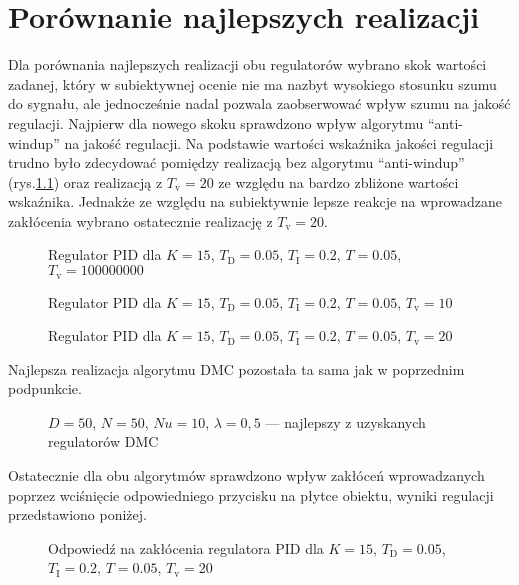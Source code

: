 \chapter{Porównanie najlepszych realizacji}
Dla porównania najlepszych realizacji obu regulatorów wybrano skok wartości zadanej, który w subiektywnej ocenie nie ma nazbyt wysokiego stosunku szumu do sygnału, ale jednocześnie nadal pozwala zaobserwować wpływ szumu na jakość regulacji. Najpierw dla nowego skoku sprawdzono wpływ algorytmu ``anti-windup'' na jakość regulacji. Na podstawie wartości wskaźnika jakości regulacji trudno było zdecydować pomiędzy realizacją bez algorytmu ``anti-windup'' (rys.\ref{PID1}) oraz realizacją z $T_\mathrm{v}=20$ ze względu na bardzo zbliżone wartości wskaźnika. Jednakże ze względu na subiektywnie lepsze reakcje na wprowadzane zakłócenia wybrano ostatecznie realizację z $T_\mathrm{v}=20$.

\begin{figure}[H]
\centering

\label{PID1}
\caption{Regulator PID dla $K = 15$, $T_\mathrm{D} = 0.05$, $T_\mathrm{I} = 0.2$, $T = 0.05$, $T_\mathrm{v} = 100000000$}
\end{figure}

\begin{figure}[H]
\centering

\label{PID2}
\caption{Regulator PID dla $K = 15$, $T_\mathrm{D} = 0.05$, $T_\mathrm{I} = 0.2$, $T = 0.05$, $T_\mathrm{v} = 10$}
\end{figure}

\begin{figure}[H]
\centering

\label{PID3}
\caption{Regulator PID dla $K = 15$, $T_\mathrm{D} = 0.05$, $T_\mathrm{I} = 0.2$, $T = 0.05$, $T_\mathrm{v} = 20$}
\end{figure}

Najlepsza realizacja algorytmu DMC pozostała ta sama jak w poprzednim podpunkcie.

\begin{figure}[H]
\centering

\caption{$ D = 50 $, $  N = 50 $, $ Nu = 10 $, $ \lambda = 0,5 $ --- najlepszy z uzyskanych regulatorów DMC}
\label{DMC6}
\end{figure}

Ostatecznie dla obu algorytmów sprawdzono wpływ zakłóceń wprowadzanych poprzez wciśnięcie odpowiedniego przycisku na płytce obiektu, wyniki regulacji przedstawiono poniżej.

\begin{figure}[H]
\centering

\label{PIDbest}
\caption{Odpowiedź na zakłócenia regulatora PID dla $K = 15$, $T_\mathrm{D} = 0.05$, $T_\mathrm{I} = 0.2$, $T = 0.05$, $T_\mathrm{v} = 20$}
\end{figure}

